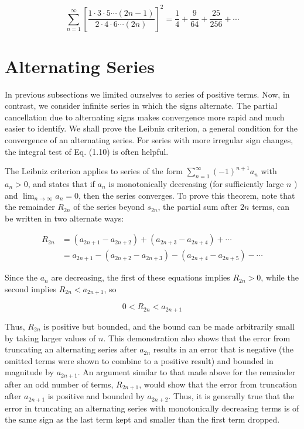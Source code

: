 \documentclass[10pt]{article}
\begin{document}
$$
\sum_{n=1}^{\infty}\left[\frac{1 \cdot 3 \cdot 5 \cdots(2 n-1)}{2 \cdot 4 \cdot 6 \cdots(2 n)}\right]^{2}=\frac{1}{4}+\frac{9}{64}+\frac{25}{256}+\cdots
$$

\section*{Alternating Series}
In previous subsections we limited ourselves to series of positive terms. Now, in contrast, we consider infinite series in which the signs alternate. The partial cancellation due to alternating signs makes convergence more rapid and much easier to identify. We shall prove the Leibniz criterion, a general condition for the convergence of an alternating series. For series with more irregular sign changes, the integral test of Eq. (1.10) is often helpful.

The Leibniz criterion applies to series of the form $\sum_{n=1}^{\infty}(-1)^{n+1} a_{n}$ with $a_{n}>0$, and states that if $a_{n}$ is monotonically decreasing (for sufficiently large $n$ ) and $\lim _{n \rightarrow \infty} a_{n}=0$, then the series converges. To prove this theorem, note that the remainder $R_{2 n}$ of the series beyond $s_{2 n}$, the partial sum after $2 n$ terms, can be written in two alternate ways:

$$
\begin{aligned}
R_{2 n} & =\left(a_{2 n+1}-a_{2 n+2}\right)+\left(a_{2 n+3}-a_{2 n+4}\right)+\cdots \\
& =a_{2 n+1}-\left(a_{2 n+2}-a_{2 n+3}\right)-\left(a_{2 n+4}-a_{2 n+5}\right)-\cdots
\end{aligned}
$$

Since the $a_{n}$ are decreasing, the first of these equations implies $R_{2 n}>0$, while the second implies $R_{2 n}<a_{2 n+1}$, so

$$
0<R_{2 n}<a_{2 n+1}
$$

Thus, $R_{2 n}$ is positive but bounded, and the bound can be made arbitrarily small by taking larger values of $n$. This demonstration also shows that the error from truncating an alternating series after $a_{2 n}$ results in an error that is negative (the omitted terms were shown to combine to a positive result) and bounded in magnitude by $a_{2 n+1}$. An argument similar to that made above for the remainder after an odd number of terms, $R_{2 n+1}$, would show that the error from truncation after $a_{2 n+1}$ is positive and bounded by $a_{2 n+2}$. Thus, it is generally true that the error in truncating an alternating series with monotonically decreasing terms is of the same sign as the last term kept and smaller than the first term dropped.
\end{document}
